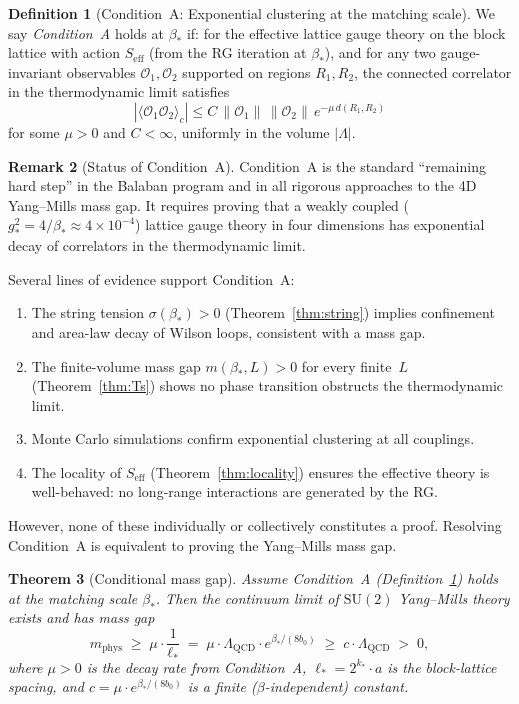 \documentclass[11pt]{article}
\newtheorem{theorem}{Theorem}[section]
\theoremstyle{definition}
\newtheorem{definition}[theorem]{Definition}
\newtheorem{remark}[theorem]{Remark}
\newcommand{\SU}{\mathrm{SU}}
\newcommand{\Lam}{\Lambda_{\mathrm{QCD}}}
\begin{document}
\begin{definition}[Condition~A: Exponential clustering at the
matching scale]\label{def:condA}
We say \emph{Condition~A} holds at $\beta_*$ if:
for the effective lattice gauge theory on the block lattice with
action $S_{\mathrm{eff}}$ (from the RG iteration at $\beta_*$),
and for any two gauge-invariant observables
$\mathcal{O}_1,\mathcal{O}_2$ supported on regions $R_1,R_2$,
the connected correlator in the thermodynamic limit satisfies
\begin{equation}\label{eq:condA}
|\langle\mathcal{O}_1\mathcal{O}_2\rangle_c|
\le C\,\|\mathcal{O}_1\|\,\|\mathcal{O}_2\|\,
e^{-\mu\,d(R_1,R_2)}
\end{equation}
for some $\mu>0$ and $C<\infty$, uniformly in the volume
$|\Lambda|$.
\end{definition}

\begin{remark}[Status of Condition~A]\label{rem:condA-status}
Condition~A is the standard ``remaining hard step'' in the
Balaban program and in all rigorous approaches to the 4D
Yang--Mills mass gap.  It requires proving that a weakly coupled
($g_*^2=4/\beta_*\approx 4\times 10^{-4}$) lattice gauge theory
in four dimensions has exponential decay of correlators in the
thermodynamic limit.

Several lines of evidence support Condition~A:
\begin{enumerate}[nosep]
\item The string tension $\sigma(\beta_*)>0$
(Theorem~\ref{thm:string}) implies confinement and area-law
decay of Wilson loops, consistent with a mass gap.
\item The finite-volume mass gap $m(\beta_*,L)>0$ for every
finite~$L$ (Theorem~\ref{thm:Ts}) shows no phase transition
obstructs the thermodynamic limit.
\item Monte Carlo simulations confirm exponential clustering
at all couplings.
\item The locality of $S_{\mathrm{eff}}$
(Theorem~\ref{thm:locality}) ensures the effective theory is
well-behaved: no long-range interactions are generated by the RG.
\end{enumerate}
However, none of these individually or collectively constitutes
a proof.  Resolving Condition~A is equivalent to proving the
Yang--Mills mass gap.
\end{remark}

\begin{theorem}[Conditional mass gap]\label{thm:conditional}
Assume Condition~A (Definition~\ref{def:condA}) holds at the
matching scale $\beta_*$.  Then the continuum limit of $\SU(2)$
Yang--Mills theory exists and has mass gap
\begin{equation}\label{eq:mgap}
m_{\mathrm{phys}}\;\ge\;\mu\cdot\frac{1}{\ell_*}
\;=\;\mu\cdot\Lam\cdot e^{\beta_*/(8b_0)}
\;\ge\; c\cdot\Lam\;>\;0,
\end{equation}
where $\mu>0$ is the decay rate from Condition~A,
$\ell_*=2^{k_*}\cdot a$ is the block-lattice spacing, and
$c=\mu\cdot e^{\beta_*/(8b_0)}$ is a finite
($\beta$-independent) constant.
\end{theorem}
\end{document}

